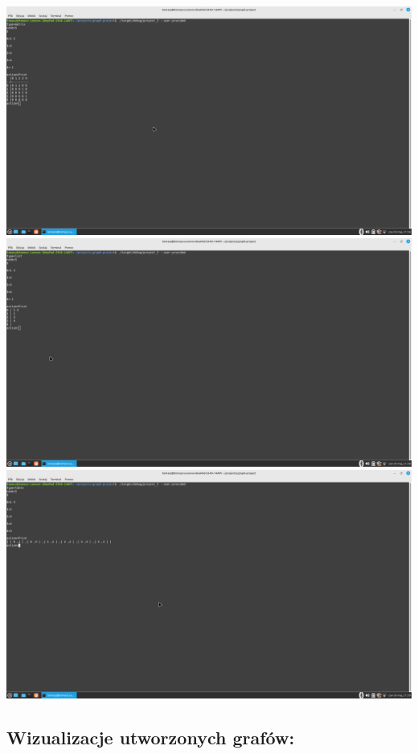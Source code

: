 \documentclass[12pt]{article}
\begin{document}
\begin{center}

\includegraphics[scale=0.2]{matrix_graph.png}
\includegraphics[scale=0.2]{list_graph.png}
\includegraphics[scale=0.2]{table_graph.png}

\end{center}

\subsection{Wizualizacje utworzonych grafów: }
\end{document}
